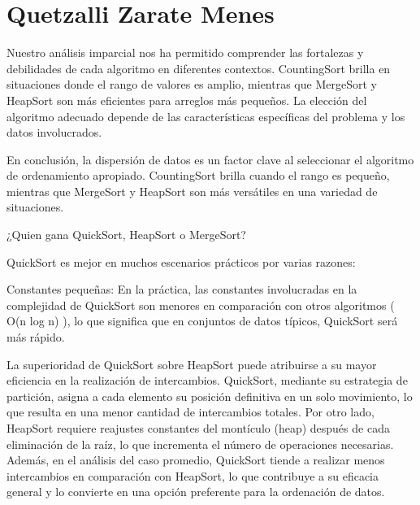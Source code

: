 \documentclass[12pt]{article}
\begin{document}
\section{Quetzalli Zarate Menes}
\par\vspace{0.4cm}
Nuestro análisis imparcial nos ha permitido comprender las fortalezas y debilidades de cada algoritmo en diferentes contextos. CountingSort brilla en situaciones donde el rango de valores es amplio, mientras que MergeSort y HeapSort son más eficientes para arreglos más pequeños. La elección del algoritmo adecuado depende de las características específicas del problema y los datos involucrados.
\par\vspace{0.4cm}
En conclusión, la dispersión de datos es un factor clave al seleccionar el algoritmo de ordenamiento apropiado. CountingSort brilla cuando el rango es pequeño, mientras que MergeSort y HeapSort son más versátiles en una variedad de situaciones.
\par\vspace{0.7cm}
¿Quien gana QuickSort, HeapSort o MergeSort?
\par\vspace{0.4cm}
QuickSort es mejor en muchos escenarios prácticos por varias razones:
\par\vspace{0.4cm}
Constantes pequeñas: En la práctica, las constantes involucradas en la complejidad de QuickSort son menores en comparación con otros algoritmos ( O(n log n) ), lo que significa que en conjuntos de datos típicos, QuickSort será más rápido.
\par\vspace{0.4cm}
La superioridad de QuickSort sobre HeapSort puede atribuirse a su mayor eficiencia en la realización de intercambios. QuickSort, mediante su estrategia de partición, asigna a cada elemento su posición definitiva en un solo movimiento, lo que resulta en una menor cantidad de intercambios totales. Por otro lado, HeapSort requiere reajustes constantes del montículo (heap) después de cada eliminación de la raíz, lo que incrementa el número de operaciones necesarias. Además, en el análisis del caso promedio, QuickSort tiende a realizar menos intercambios en comparación con HeapSort, lo que contribuye a su eficacia general y lo convierte en una opción preferente para la ordenación de datos.
\par\vspace{0.6cm}
\end{document}
